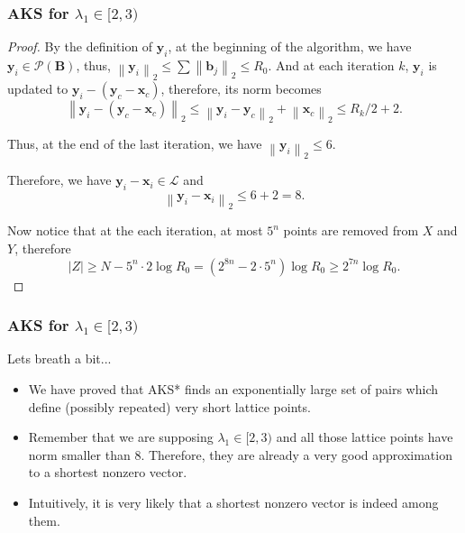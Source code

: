 \documentclass[aspectratio=43]{beamer}
\newcommand{\norm}[1]{\left\lVert #1 \right\rVert_2}
\let\vec\mathbf %
\theoremstyle{remark}
\begin{document}
\begin{frame}
\frametitle{AKS for $\lambda_1 \in [2, 3)$}

\begin{proof}
	
	By the definition of $\vec{y}_i$, at the beginning of the algorithm, we 
	have $\vec{y}_i \in \mathcal{P}(\vec B)$, thus, $\norm{\vec{y}_i} \le 
	\sum\norm{\vec{b}_j} \le R_0$. And at each iteration $k$, $\vec{y}_i$ is 
	updated 
	to $\vec{y}_i - (\vec{y}_c - \vec{x}_c)$, therefore, its norm becomes
	$$\norm{\vec{y}_i - (\vec{y}_c - \vec{x}_c)} \le \norm{\vec{y}_i - 
		\vec{y}_c} + \norm{ \vec{x}_c} \le R_k/2 + 2.$$
	
	Thus, at the end of the last iteration, we have $\norm{\vec{y}_i} \le 6$.
	
	Therefore, we have $\vec{y}_i - \vec{x}_i \in \mathcal{L}$ and 
	$$\norm{\vec{y}_i - \vec{x}_i} \le 6 + 2 = 8.$$
	
	Now notice that at the each iteration, at most $5^n$ points are removed 
	from $X$ and $Y$, therefore 
	$$|Z| \ge N - 5^n\cdot 2\log R_0 = (2^{8n} - 2\cdot 
	5^n)\log R_0 \ge 2^{7n}\log R_0.$$
\end{proof}

\end{frame}


\begin{frame}
\frametitle{AKS for $\lambda_1 \in [2, 3)$}

Lets breath a bit...
\begin{itemize}
\item We have proved that {\sc AKS*} finds an exponentially large 
set of pairs which define (possibly repeated) very short lattice points.

\item Remember that we are supposing $\lambda_1 \in [2, 3)$ and all those 
lattice points have norm smaller than $8$. Therefore, they are already a very 
good approximation to a shortest nonzero vector.

\item Intuitively, it is very likely that a shortest 
nonzero vector is indeed among them.
\end{itemize}
\end{frame}
\end{document}
